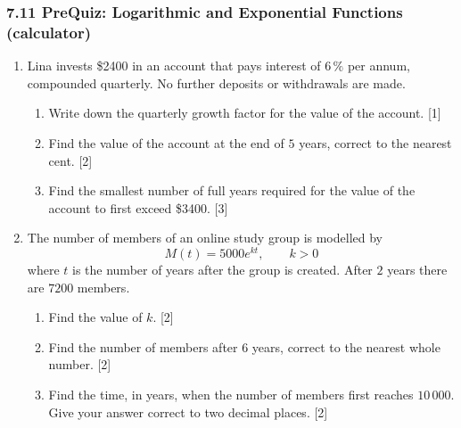 \documentclass[12pt, twoside]{article}
\begin{document}
\subsubsection*{7.11 PreQuiz: Logarithmic and Exponential Functions
(calculator)}

\begin{enumerate}[itemsep=0.15cm]

\item[1.] [Maximum mark: 6]

Lina invests \$2400 in an account that pays interest of $6\,\%$ per
annum, compounded quarterly. No further deposits or withdrawals are made.

\begin{enumerate}[itemsep=0.1cm]
  \item Write down the quarterly growth factor for the value of the
  account. \hfill [1]
  \item Find the value of the account at the end of $5$ years, correct
  to the nearest cent. \hfill [2]
  \item Find the smallest number of full years required for the value of
  the account to first exceed \$3400. \hfill [3]
\end{enumerate}


\newpage

\item[2.] [Maximum mark: 6]

The number of members of an online study group is modelled by
$$M(t) = 5000 e^{kt}, \qquad k > 0$$
where $t$ is the number of years after the group is created. After
$2$ years there are $7200$ members.

\begin{enumerate}[itemsep=0.1cm]
  \item Find the value of $k$. \hfill [2]
  \item Find the number of members after $6$ years, correct to the
  nearest whole number. \hfill [2]
  \item Find the time, in years, when the number of members first
  reaches $10\,000$. Give your answer correct to two decimal places.
  \hfill [2]
\end{enumerate}


\end{enumerate}
\end{document}
